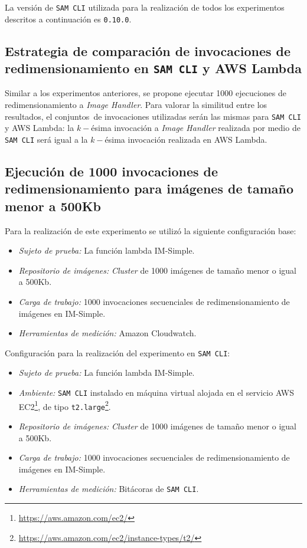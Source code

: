La versión de \texttt{SAM CLI} utilizada para la realización de todos los experimentos descritos a continuación es \texttt{0.10.0}.

\subsection{Estrategia de comparación de invocaciones de redimensionamiento en \texttt{SAM CLI} y AWS Lambda}

Similar a los experimentos anteriores, se propone ejecutar 1000 ejecuciones de redimensionamiento a \emph{Image Handler}. Para valorar la similitud entre los resultados, el conjuntos\ de invocaciones utilizadas serán las mismas para \texttt{SAM CLI} y AWS Lambda: la $k-$ésima invocación a \emph{Image Handler} realizada por medio de \texttt{SAM CLI} será igual a la $k-$ésima invocación realizada en AWS Lambda.

\subsection{Ejecución de 1000 invocaciones de redimensionamiento para imágenes de tamaño menor a 500Kb}

Para la realización de este experimento se utilizó la siguiente configuración base:
\begin{itemize}
    \item \emph{Sujeto de prueba:} La función lambda IM-Simple.
    \item \emph{Repositorio de imágenes:} \emph{Cluster} de 1000 imágenes de tamaño menor o igual a 500Kb.
    \item \emph{Carga de trabajo:} 1000 invocaciones secuenciales de redimensionamiento de imágenes en IM-Simple.
    \item \emph{Herramientas de medición:} Amazon Cloudwatch.
\end{itemize}

Configuración para la realización del experimento en \texttt{SAM CLI}:
\begin{itemize}
    \item \emph{Sujeto de prueba:} La función lambda IM-Simple.
    \item \emph{Ambiente:} \texttt{SAM CLI} instalado en máquina virtual alojada en el servicio AWS EC2\footnote{\url{https://aws.amazon.com/ec2/}}, de tipo \texttt{t2.large}\footnote{\url{https://aws.amazon.com/ec2/instance-types/t2/}}.
    \item \emph{Repositorio de imágenes:} \emph{Cluster} de 1000 imágenes de tamaño menor o igual a 500Kb.
    \item \emph{Carga de trabajo:} 1000 invocaciones secuenciales de redimensionamiento de imágenes en IM-Simple.
    \item \emph{Herramientas de medición:} Bitácoras de \texttt{SAM CLI}.
\end{itemize}


